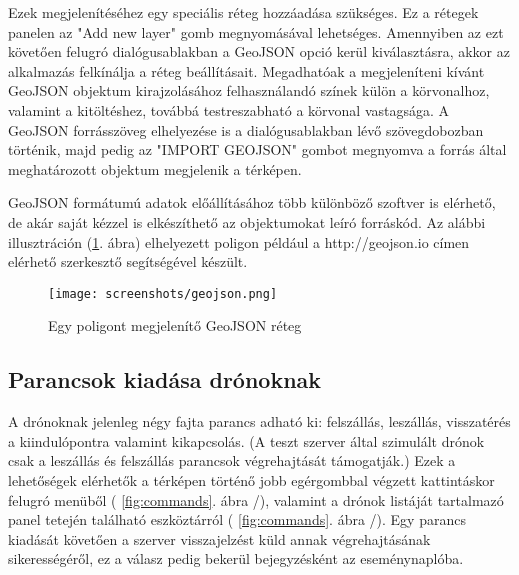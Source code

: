 Ezek megjelenítéséhez egy speciális réteg hozzáadása szükséges. Ez a rétegek
panelen az "Add new layer" gomb megnyomásával lehetséges. Amennyiben az ezt
követően felugró dialógusablakban a GeoJSON opció kerül kiválasztásra, akkor az
alkalmazás felkínálja a réteg beállításait. Megadhatóak a megjeleníteni kívánt
GeoJSON objektum kirajzolásához felhasználandó színek külön a körvonalhoz,
valamint a kitöltéshez, továbbá testreszabható a körvonal vastagsága. A GeoJSON
forrásszöveg elhelyezése is a dialógusablakban lévő szövegdobozban történik,
majd pedig az "IMPORT GEOJSON" gombot megnyomva a forrás által meghatározott
objektum megjelenik a térképen.

GeoJSON formátumú adatok előállításához több különböző szoftver is elérhető, de
akár saját kézzel is elkészíthető az objektumokat leíró forráskód. Az alábbi
illusztráción (\ref{fig:geojson}. ábra) elhelyezett poligon például a
http://geojson.io címen elérhető szerkesztő segítségével készült.

\begin{figure}[H]
  \texttt{[image: screenshots/geojson.png]}
  \caption{Egy poligont megjelenítő GeoJSON réteg}
  \label{fig:geojson}
\end{figure}

\subsection{Parancsok kiadása drónoknak}

A drónoknak jelenleg négy fajta parancs adható ki: felszállás, leszállás,
visszatérés a kiindulópontra valamint kikapcsolás. (A teszt szerver által
szimulált drónok csak a leszállás és felszállás parancsok végrehajtását
támogatják.) Ezek a lehetőségek elérhetők a térképen történő jobb egérgombbal
végzett kattintáskor felugró menüből ( \ref{fig:commands}. ábra /),
valamint a drónok listáját tartalmazó panel tetején található eszköztárról
( \ref{fig:commands}. ábra /). Egy parancs kiadását követően a
szerver visszajelzést küld annak végrehajtásának sikerességéről, ez a válasz
pedig bekerül bejegyzésként az eseménynaplóba.

